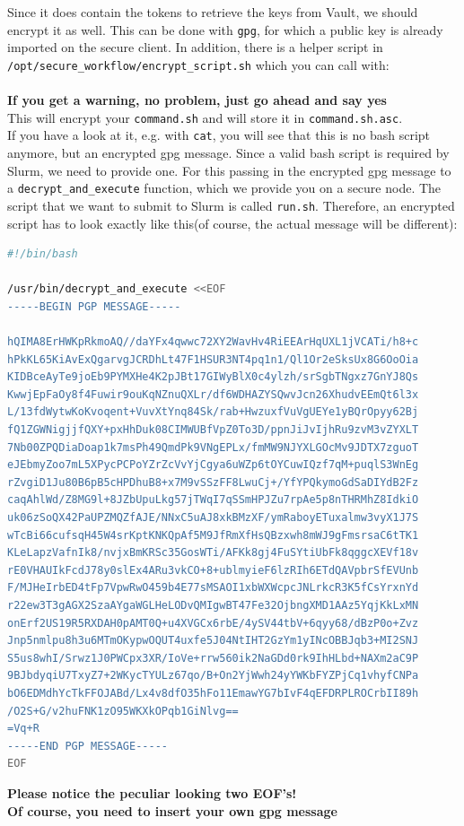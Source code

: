 \documentclass[paper=a4]{scrartcl}
\begin{document}
Since it does contain the tokens to retrieve the keys from Vault, we should encrypt it as well. 
This can be done with \texttt{gpg}, for which a public key is already imported on the secure client. 
In addition, there is a helper script in \texttt{/opt/secure\_workflow/encrypt\_script.sh} which you can call with: \\
 \\
\textbf{If you get a warning, no problem, just go ahead and say yes} \\
This will encrypt your \texttt{command.sh} and will store it in \texttt{command.sh.asc}. 
\\
If you have a look at it, e.g. with \texttt{cat}, you will see that this is no bash script anymore, but an encrypted gpg message.
Since a valid bash script is required by Slurm, we need to provide one. 
For this passing in the encrypted gpg message to a \texttt{decrypt\_and\_execute} function, which we provide you on a secure node. 
The script that we want to submit to Slurm is called \texttt{run.sh}. 
Therefore, an encrypted script has to look exactly like this(of course, the actual message will be different): \\
\begin{lstlisting}[language=bash, caption=run.sh] 
#!/bin/bash

/usr/bin/decrypt_and_execute <<EOF
-----BEGIN PGP MESSAGE-----

hQIMA8ErHWKpRkmoAQ//daYFx4qwwc72XY2WavHv4RiEEArHqUXL1jVCATi/h8+c
hPkKL65KiAvExQgarvgJCRDhLt47F1HSUR3NT4pq1n1/Ql1Or2eSksUx8G6OoOia
KIDBceAyTe9joEb9PYMXHe4K2pJBt17GIWyBlX0c4ylzh/srSgbTNgxz7GnYJ8Qs
KwwjEpFaOy8f4Fuwir9ouKqNZnuQXLr/df6WDHAZYSQwvJcn26XhudvEEmQt6l3x
L/13fdWytwKoKvoqent+VuvXtYnq84Sk/rab+HwzuxfVuVgUEYe1yBQrOpyy62Bj
fQ1ZGWNigjjfQXY+pxHhDuk08CIMWUBfVpZ0To3D/ppnJiJvIjhRu9zvM3vZYXLT
7Nb00ZPQDiaDoap1k7msPh49QmdPk9VNgEPLx/fmMW9NJYXLGOcMv9JDTX7zguoT
eJEbmyZoo7mL5XPycPCPoYZrZcVvYjCgya6uWZp6tOYCuwIQzf7qM+puqlS3WnEg
rZvgiD1Ju80B6pB5cHPDhuB8+x7M9vSSzFF8LwuCj+/YfYPQkymoGdSaDIYdB2Fz
caqAhlWd/Z8MG9l+8JZbUpuLkg57jTWqI7qSSmHPJZu7rpAe5p8nTHRMhZ8IdkiO
uk06zSoQX42PaUPZMQZfAJE/NNxC5uAJ8xkBMzXF/ymRaboyETuxalmw3vyX1J7S
wTcBi66cufsqH45W4srKptKNKQpAf5M9JfRmXfHsQBzxwh8mWJ9gFmsrsaC6tTK1
KLeLapzVafnIk8/nvjxBmKRSc35GosWTi/AFKk8gj4FuSYtiUbFk8qggcXEVf18v
rE0VHAUIkFcdJ78y0slEx4ARu3vkCO+8+ublmyieF6lzRIh6ETdQAVpbrSfEVUnb
F/MJHeIrbED4tFp7VpwRwO459b4E77sMSAOI1xbWXWcpcJNLrkcR3K5fCsYrxnYd
r22ew3T3gAGX2SzaAYgaWGLHeLODvQMIgwBT47Fe32OjbngXMD1AAz5YqjKkLxMN
onErf2US19R5RXDAH0pAMT0Q+u4XVGCx6rbE/4ySV44tbV+6qyy68/dBzP0o+Zvz
Jnp5nmlpu8h3u6MTmOKypwOQUT4uxfe5J04NtIHT2GzYm1yINcOBBJqb3+MI2SNJ
S5us8whI/Srwz1J0PWCpx3XR/IoVe+rrw560ik2NaGDd0rk9IhHLbd+NAXm2aC9P
9BJbdyqiU7TxyZ7+2WKycTYULz67qo/B+On2YjWwh24yYWKbFYZPjCq1vhyfCNPa
bO6EDMdhYcTkFFOJABd/Lx4v8dfO35hFo11EmawYG7bIvF4qEFDRPLROCrbII89h
/O2S+G/v2huFNK1zO95WKXkOPqb1GiNlvg==
=Vq+R
-----END PGP MESSAGE-----
EOF
\end{lstlisting}
\textbf{Please notice the peculiar looking two EOF's!} \\
\textbf{Of course, you need to insert your own gpg message}
\end{document}
